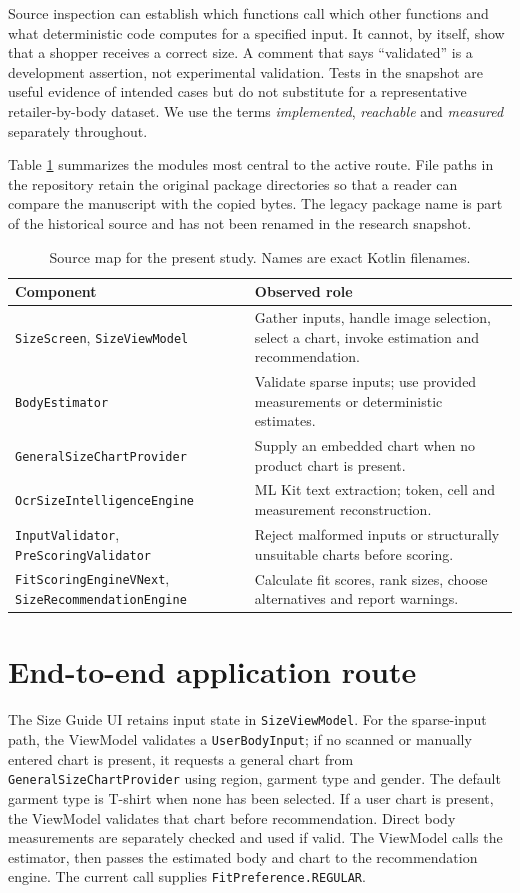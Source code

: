 \documentclass[11pt,a4paper]{article}
\begin{document}
Source inspection can establish which functions call which other functions and what deterministic code computes for a specified input. It cannot, by itself, show that a shopper receives a correct size. A comment that says ``validated'' is a development assertion, not experimental validation. Tests in the snapshot are useful evidence of intended cases but do not substitute for a representative retailer-by-body dataset. We use the terms \emph{implemented}, \emph{reachable} and \emph{measured} separately throughout.

Table \ref{tab:map} summarizes the modules most central to the active route. File paths in the repository retain the original package directories so that a reader can compare the manuscript with the copied bytes. The legacy package name is part of the historical source and has not been renamed in the research snapshot.

\begin{table}[ht]
\centering\small
\caption{Source map for the present study. Names are exact Kotlin filenames.}
\label{tab:map}
\begin{tabularx}{\linewidth}{@{}p{.34\linewidth}X@{}}
\toprule
Component & Observed role \\
\midrule
\texttt{SizeScreen}, \texttt{SizeViewModel} & Gather inputs, handle image selection, select a chart, invoke estimation and recommendation. \\
\texttt{BodyEstimator} & Validate sparse inputs; use provided measurements or deterministic estimates. \\
\texttt{GeneralSizeChartProvider} & Supply an embedded chart when no product chart is present. \\
\texttt{OcrSizeIntelligenceEngine} & ML Kit text extraction; token, cell and measurement reconstruction. \\
\texttt{InputValidator}, \texttt{PreScoringValidator} & Reject malformed inputs or structurally unsuitable charts before scoring. \\
\texttt{FitScoringEngineVNext}, \texttt{SizeRecommendationEngine} & Calculate fit scores, rank sizes, choose alternatives and report warnings. \\
\bottomrule
\end{tabularx}
\end{table}

\section{End-to-end application route}
The Size Guide UI retains input state in \texttt{SizeViewModel}. For the sparse-input path, the ViewModel validates a \texttt{UserBodyInput}; if no scanned or manually entered chart is present, it requests a general chart from \texttt{GeneralSizeChartProvider} using region, garment type and gender. The default garment type is T-shirt when none has been selected. If a user chart is present, the ViewModel validates that chart before recommendation. Direct body measurements are separately checked and used if valid. The ViewModel calls the estimator, then passes the estimated body and chart to the recommendation engine. The current call supplies \texttt{FitPreference.REGULAR}.
\end{document}
